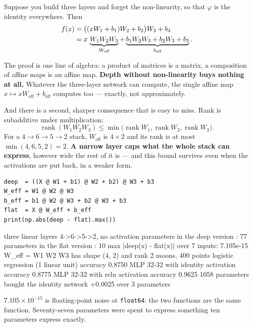 \documentclass[11pt]{article}
\begin{document}
Suppose you build three layers and forget the non-linearity, so that
$\varphi$ is the identity everywhere. Then
\begin{align}
  f(x) &= \big((x W_1 + b_1)W_2 + b_2\big)W_3 + b_3 \notag\\
       &= x\,\underbrace{W_1W_2W_3}_{W_{\text{eff}}}
        + \underbrace{b_1W_2W_3 + b_2W_3 + b_3}_{b_{\text{eff}}}.
  \label{eq:collapse}
\end{align}

The proof is one line of algebra: a product of matrices is a matrix, a
composition of affine maps is an affine map. \textbf{Depth without
non-linearity buys nothing at all.} Whatever the three-layer network can
compute, the single affine map $x \mapsto xW_{\text{eff}} + b_{\text{eff}}$
computes too --- exactly, not approximately.

And there is a second, sharper consequence that is easy to miss. Rank is
subadditive under multiplication:
\[
  \operatorname{rank}(W_1W_2W_3)
  \le \min\big(\operatorname{rank} W_1, \operatorname{rank} W_2,
  \operatorname{rank} W_3\big).
\]
For a $4 \to 6 \to 5 \to 2$ stack, $W_{\text{eff}}$ is $4 \times 2$ and its
rank is at most $\min(4,6,5,2) = 2$. \textbf{A narrow layer caps what the
whole stack can express}, however wide the rest of it is --- and this bound
survives even when the activations are put back, in a weaker form.

\begin{lstlisting}
deep  = ((X @ W1 + b1) @ W2 + b2) @ W3 + b3
W_eff = W1 @ W2 @ W3
b_eff = b1 @ W2 @ W3 + b2 @ W3 + b3
flat  = X @ W_eff + b_eff
print(np.abs(deep - flat).max())
\end{lstlisting}
\begin{codeout}
three linear layers 4->6->5->2, no activation
   parameters in the deep version : 77
   parameters in the flat version : 10
   max |deep(x) - flat(x)| over 7 inputs: 7.105e-15
   W_eff = W1 W2 W3 has shape (4, 2) and rank 2
moons, 400 points
   logistic regression (1 linear unit)      accuracy 0.8750
   MLP 32-32 with identity activation       accuracy 0.8775
   MLP 32-32 with relu activation           accuracy 0.9625
   1058 parameters bought the identity network +0.0025 over 3 parameters
\end{codeout}

$7.105\times10^{-15}$ is floating-point noise at \texttt{float64}: the two
functions are the same function. Seventy-seven parameters were spent to
express something ten parameters express exactly.
\end{document}
